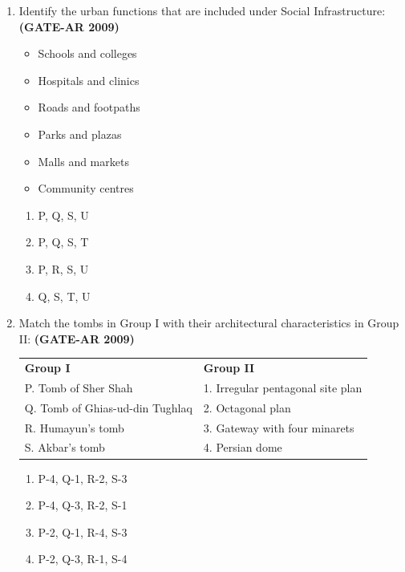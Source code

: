 \documentclass[a4paper,10pt]{article}
\begin{document}
\begin{enumerate}
    \item Identify the urban functions that are included under Social Infrastructure: \hfill \textbf{(GATE-AR 2009)}
    \begin{itemize}
        \item Schools and colleges
        \item Hospitals and clinics
        \item Roads and footpaths
        \item Parks and plazas
        \item Malls and markets
        \item Community centres
    \end{itemize}
    \begin{multicols}{4}
	\begin{enumerate}
        \item P, Q, S, U
        \item P, Q, S, T
        \item P, R, S, U
        \item Q, S, T, U
    \end{enumerate}
	\end{multicols}

    \item Match the tombs in Group I with their architectural characteristics in Group II: \hfill \textbf{(GATE-AR 2009)} \\
    \begin{tabular}{ l l }
	\textbf{Group I} & \textbf{Group II} \\
	P. Tomb of Sher Shah & 1. Irregular pentagonal site plan \\
	Q. Tomb of Ghias-ud-din Tughlaq & 2. Octagonal plan \\
	R. Humayun’s tomb & 3. Gateway with four minarets \\
	S. Akbar’s tomb & 4. Persian dome \\
	\end{tabular}
	\begin{multicols}{2}
	\begin{enumerate}
        \item P-4, Q-1, R-2, S-3
        \item P-4, Q-3, R-2, S-1
        \item P-2, Q-1, R-4, S-3
        \item P-2, Q-3, R-1, S-4
    \end{enumerate}
	\end{multicols}


\end{enumerate}
\end{document}
